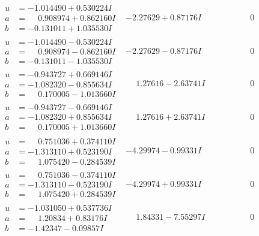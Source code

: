 \documentclass[1p]{elsarticle_modified}
\theoremstyle{definition}
\begin{document}
$$\begin{array}{c|c|c}
\begin{aligned}
u &= -1.014490 + 0.530224 I \\
a &= \phantom{-}0.908974 + 0.862160 I \\
b &= -0.131011 + 1.035530 I\end{aligned}
 & -2.27629 + 0.87176 I & \phantom{-0.000000 } 0 \\ \hline\begin{aligned}
u &= -1.014490 - 0.530224 I \\
a &= \phantom{-}0.908974 - 0.862160 I \\
b &= -0.131011 - 1.035530 I\end{aligned}
 & -2.27629 - 0.87176 I & \phantom{-0.000000 } 0 \\ \hline\begin{aligned}
u &= -0.943727 + 0.669146 I \\
a &= -1.082320 - 0.855634 I \\
b &= \phantom{-}0.170005 - 1.013660 I\end{aligned}
 & \phantom{-}1.27616 - 2.63741 I & \phantom{-0.000000 } 0 \\ \hline\begin{aligned}
u &= -0.943727 - 0.669146 I \\
a &= -1.082320 + 0.855634 I \\
b &= \phantom{-}0.170005 + 1.013660 I\end{aligned}
 & \phantom{-}1.27616 + 2.63741 I & \phantom{-0.000000 } 0 \\ \hline\begin{aligned}
u &= \phantom{-}0.751036 + 0.374110 I \\
a &= -1.313110 + 0.523190 I \\
b &= \phantom{-}1.075420 - 0.284539 I\end{aligned}
 & -4.29974 - 0.99331 I & \phantom{-0.000000 } 0 \\ \hline\begin{aligned}
u &= \phantom{-}0.751036 - 0.374110 I \\
a &= -1.313110 - 0.523190 I \\
b &= \phantom{-}1.075420 + 0.284539 I\end{aligned}
 & -4.29974 + 0.99331 I & \phantom{-0.000000 } 0 \\ \hline\begin{aligned}
u &= -1.031050 + 0.537736 I \\
a &= \phantom{-}1.20834 + 0.83176 I \\
b &= -1.42347 - 0.09857 I\end{aligned}
 & \phantom{-}1.84331 - 7.55297 I & \phantom{-0.000000 } 0 \\ \hline\begin{aligned}

\end{aligned}
\end{array}$$
\end{document}
